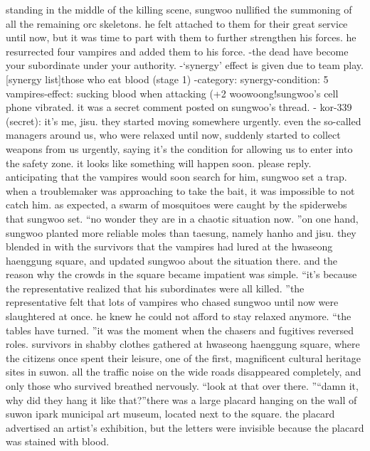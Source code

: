 standing in the middle of the killing scene, sungwoo nullified the summoning of all the remaining orc skeletons.
 he felt attached to them for their great service until now, but it was time to part with them to further strengthen his forces.
 he resurrected four vampires and added them to his force.
-the dead have become your subordinate under your authority.
-‘synergy’ effect is given due to team play.
[synergy list]those who eat blood (stage 1) -category: synergy-condition: 5 vampires-effect: sucking blood when attacking (+2%
woowoong!sungwoo’s cell phone vibrated.
 it was a secret comment posted on sungwoo’s thread.
- kor-339 (secret): it’s me, jisu.
 they started moving somewhere urgently.
 even the so-called managers around us, who were relaxed until now, suddenly started to collect weapons from us urgently, saying it’s the condition for allowing us to enter into the safety zone.
 it looks like something will happen soon.
 please reply.
anticipating that the vampires would soon search for him, sungwoo set a trap.
when a troublemaker was approaching to take the bait, it was impossible to not catch him.
 as expected, a swarm of mosquitoes were caught by the spiderwebs that sungwoo set.
“no wonder they are in a chaotic situation now.
”on one hand, sungwoo planted more reliable moles than taesung, namely hanho and jisu.
 they blended in with the survivors that the vampires had lured at the hwaseong haenggung square, and updated sungwoo about the situation there.
 and the reason why the crowds in the square became impatient was simple.
“it’s because the representative realized that his subordinates were all killed.
”the representative felt that lots of vampires who chased sungwoo until now were slaughtered at once.
 he knew he could not afford to stay relaxed anymore.
“the tables have turned.
”it was the moment when the chasers and fugitives reversed roles.
survivors in shabby clothes gathered at hwaseong haenggung square, where the citizens once spent their leisure, one of the first, magnificent cultural heritage sites in suwon.
 all the traffic noise on the wide roads disappeared completely, and only those who survived breathed nervously.
“look at that over there.
”“damn it, why did they hang it like that?”there was a large placard hanging on the wall of suwon ipark municipal art museum, located next to the square.
 the placard advertised an artist’s exhibition, but the letters were invisible because the placard was stained with blood.
